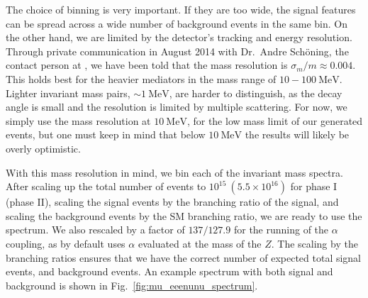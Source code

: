 The choice of binning is very important.
If they are too wide, the signal features can be spread across a wide number of background events in the same bin.
On the other hand, we are limited by the detector's tracking and energy resolution.
Through private communication in August 2014 with Dr.~Andre Sch\"oning, the contact person at \mueee, we have been told that the mass resolution is $\sigma_m / m \approx 0.004$.
This holds best for the heavier mediators in the mass range of $10 - 100~\textrm{MeV}$.
Lighter invariant mass pairs, $\sim 1~\textrm{MeV}$, are harder to distinguish, as the decay angle is small and the resolution is limited by multiple scattering.
For now, we simply use the mass resolution at $10~\textrm{MeV}$, for the low mass limit of our generated events, but one must keep in mind that below $10~\textrm{MeV}$ the results will likely be overly optimistic.

With this mass resolution in mind, we bin each of the invariant mass spectra.
After scaling up the total number of events to $10^{15}~(5.5\times 10^{16})$ for \mueee phase I (phase II), scaling the signal events by the branching ratio of the signal, and scaling the background events by the SM branching ratio, we are ready to use the spectrum.
We also rescaled by a factor of $137 / 127.9$ for the running of the $\alpha$ coupling, as \madgraph by default uses $\alpha$ evaluated at the mass of the $Z$.
The scaling by the branching ratios ensures that we have the correct number of expected total signal events, and background events.
An example spectrum with both signal and background is shown in Fig.~\ref{fig:mu_eeenunu_spectrum}.

